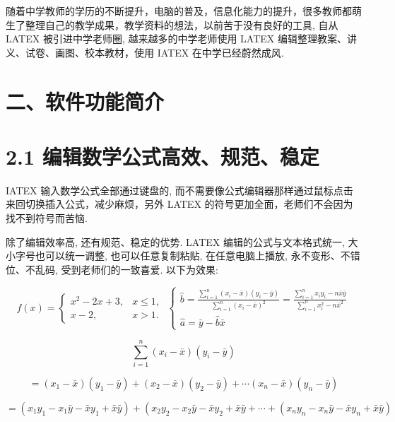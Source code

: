 \documentclass[10pt]{article}
\begin{document}
随着中学教师的学历的不断提升，电脑的普及，信息化能力的提升，很多教师都萌生了整理自己的教学成果，教学资料的想法，以前苦于没有良好的工具, 自从 LATEX 被引进中学老师圈, 越来越多的中学老师使用 LATEX 编辑整理教案、讲义、试卷、画图、校本教材，使用 IATEX 在中学已经蔚然成风.

\section*{二、软件功能简介}

\section*{2.1 编辑数学公式高效、规范、稳定}

IATEX 输入数学公式全部通过键盘的, 而不需要像公式编辑器那样通过鼠标点击来回切换插入公式，减少麻烦，另外 LATEX 的符号更加全面，老师们不会因为找不到符号而苦恼.

除了编辑效率高, 还有规范、稳定的优势. LATEX 编辑的公式与文本格式统一, 大小字号也可以统一调整, 也可以任意复制粘贴, 在任意电脑上播放, 永不变形、不错位、不乱码, 受到老师们的一致喜爱. 以下为效果:

\[
f\left( x\right)  = \left\{  \begin{array}{ll} {x}^{2} - {2x} + 3, & x \leq  1, \\  x - 2, & x > 1. \end{array}\right. \;\left\{  \begin{array}{l} \widehat{b} = \frac{\mathop{\sum }\limits_{{i = 1}}^{n}\left( {{x}_{i} - \bar{x}}\right) \left( {{y}_{i} - \bar{y}}\right) }{\mathop{\sum }\limits_{{i = 1}}^{n}{\left( {x}_{i} - \bar{x}\right) }^{2}} = \frac{\mathop{\sum }\limits_{{i = 1}}^{n}{x}_{i}{y}_{i} - n\bar{x}\bar{y}}{\mathop{\sum }\limits_{{i = 1}}^{n}{x}_{i}^{2} - n{\bar{x}}^{2}} \\  \widehat{a} = \bar{y} - \widehat{b}\bar{x} \end{array}\right.
\]

\[
\mathop{\sum }\limits_{{i = 1}}^{n}\left( {{x}_{i} - \bar{x}}\right) \left( {{y}_{i} - \bar{y}}\right)
\]

\[
= \left( {{x}_{1} - \bar{x}}\right) \left( {{y}_{1} - \bar{y}}\right)  + \left( {{x}_{2} - \bar{x}}\right) \left( {{y}_{2} - \bar{y}}\right)  + \cdots \left( {{x}_{n} - \bar{x}}\right) \left( {{y}_{n} - \bar{y}}\right)
\]

\[
= \left( {{x}_{1}{y}_{1} - {x}_{1}\bar{y} - \bar{x}{y}_{1} + \bar{x}\bar{y}}\right)  + \left( {{x}_{2}{y}_{2} - {x}_{2}\bar{y} - \bar{x}{y}_{2} + \bar{x}\bar{y} + \cdots  + \left( {{x}_{n}{y}_{n} - {x}_{n}\bar{y} - \bar{x}{y}_{n} + \bar{x}\bar{y}}\right) }\right.
\]
\end{document}
